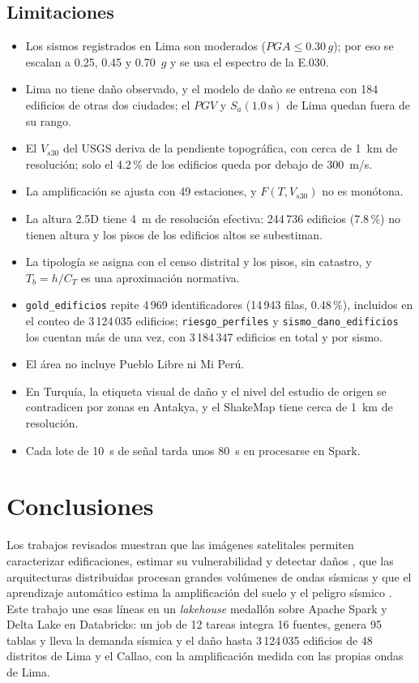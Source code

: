 \documentclass[conference]{IEEEtran}%
\newcommand{\vs}{V_{s30}}
\begin{document}
\subsection{Limitaciones}
\begin{itemize}
  \item Los sismos registrados en Lima son moderados ($PGA\leq0.30\,g$); por eso se escalan a 0.25, 0.45 y 0.70~$g$ y se usa el espectro de la E.030.
  \item Lima no tiene daño observado, y el modelo de daño se entrena con 184 edificios de otras dos ciudades; el $PGV$ y $S_a(1.0\,\mathrm{s})$ de Lima quedan fuera de su rango.
  \item El $\vs$ del USGS deriva de la pendiente topográfica, con cerca de 1~km de resolución; solo el 4.2\,\% de los edificios queda por debajo de 300~m/s.
  \item La amplificación se ajusta con 49 estaciones, y $F(T,\vs)$ no es monótona.
  \item La altura 2.5D tiene 4~m de resolución efectiva: 244\,736 edificios (7.8\,\%) no tienen altura y los pisos de los edificios altos se subestiman.
  \item La tipología se asigna con el censo distrital y los pisos, sin catastro, y $T_b=h/C_T$ es una aproximación normativa.
  \item \texttt{gold\_edificios} repite 4\,969 identificadores (14\,943 filas, 0.48\,\%), incluidos en el conteo de 3\,124\,035 edificios; \texttt{riesgo\_perfiles} y \texttt{sismo\_dano\_edificios} los cuentan más de una vez, con 3\,184\,347 edificios en total y por sismo.
  \item El área no incluye Pueblo Libre ni Mi Perú.
  \item En Turquía, la etiqueta visual de daño y el nivel del estudio de origen se contradicen por zonas en Antakya, y el ShakeMap tiene cerca de 1~km de resolución.
  \item Cada lote de 10~s de señal tarda unos 80~s en procesarse en Spark.
\end{itemize}

\section{Conclusiones}\label{sec:conclusiones}
Los trabajos revisados muestran que las imágenes satelitales permiten caracterizar edificaciones, estimar su vulnerabilidad y detectar daños \cite{carpanese2023,fan2021plsv,gupta2019xbd}, que las arquitecturas distribuidas procesan grandes volúmenes de ondas sísmicas \cite{zhu2022quakeflow} y que el aprendizaje automático estima la amplificación del suelo y el peligro sísmico \cite{wang2023amp,izquierdo2022pisco}. Este trabajo une esas líneas en un \emph{lakehouse} medallón sobre Apache Spark y Delta Lake en Databricks: un job de 12 tareas integra 16 fuentes, genera 95 tablas y lleva la demanda sísmica y el daño hasta 3\,124\,035 edificios de 48 distritos de Lima y el Callao, con la amplificación medida con las propias ondas de Lima.
\end{document}
